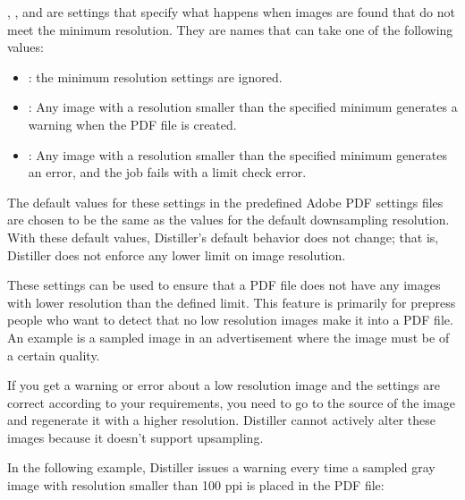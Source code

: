 \documentclass[letterpaper,12pt,english,openany,oneside]{sphinxmanual}
\begin{document}
 ,  , and  are settings that specify what happens when images are found that do not meet the minimum resolution. They are names that can take one of the following values:
\begin{itemize}
\item {} 
 : the minimum resolution settings are ignored.

\item {} 
 : Any image with a resolution smaller than the specified minimum generates a warning when the PDF file is created.

\item {} 
 : Any image with a resolution smaller than the specified minimum generates an error, and the job fails with a limit check error.

\end{itemize}

The default values for these settings in the predefined Adobe PDF settings files are chosen to be the same as the values for the default downsampling resolution. With these default values, Distiller’s default behavior does not change; that is, Distiller does not enforce any lower limit on image resolution.

These settings can be used to ensure that a PDF file does not have any images with lower resolution than the defined limit. This feature is primarily for prepress people who want to detect that no low resolution images make it into a PDF file. An example is a sampled image in an advertisement where the image must be of a certain quality.

If you get a warning or error about a low resolution image and the settings are correct according to your requirements, you need to go to the source of the image and regenerate it with a higher resolution. Distiller cannot actively alter these images because it doesn’t support up\sphinxhyphen{}sampling.

In the following example, Distiller issues a warning every time a sampled gray image with resolution smaller than 100 ppi is placed in the PDF file:

\begin{sphinxVerbatim}[commandchars=\\\{\}]
 
 
\end{sphinxVerbatim}
\end{document}
